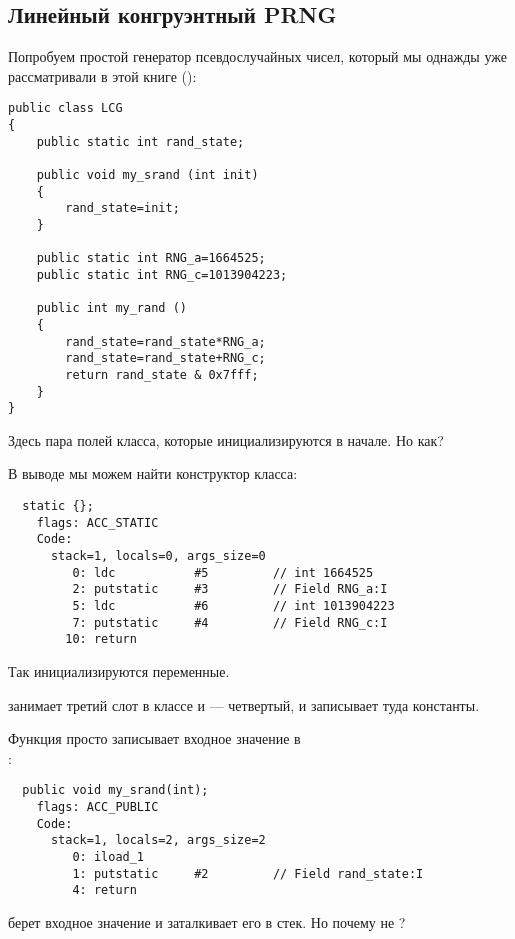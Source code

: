 \subsection{Линейный конгруэнтный \ac{PRNG}}


Попробуем простой генератор псевдослучайных чисел, 
который мы однажды уже рассматривали в этой книге ():

\begin{lstlisting}
public class LCG 
{
	public static int rand_state;

	public void my_srand (int init)
	{
		rand_state=init;
	}

	public static int RNG_a=1664525;
	public static int RNG_c=1013904223;

	public int my_rand ()
	{
		rand_state=rand_state*RNG_a;
		rand_state=rand_state+RNG_c;
		return rand_state & 0x7fff;
	}
}
\end{lstlisting}


Здесь пара полей класса, которые инициализируются в начале.
Но как?

В выводе  мы можем найти конструктор класса:

\begin{lstlisting}
  static {};
    flags: ACC_STATIC
    Code:
      stack=1, locals=0, args_size=0
         0: ldc           #5         // int 1664525
         2: putstatic     #3         // Field RNG_a:I
         5: ldc           #6         // int 1013904223
         7: putstatic     #4         // Field RNG_c:I
        10: return        
\end{lstlisting}


Так инициализируются переменные.

 занимает третий слот в классе и  --- четвертый, 
и  записывает туда константы.


Функция  просто записывает входное значение в \\ 
:

\begin{lstlisting}
  public void my_srand(int);
    flags: ACC_PUBLIC
    Code:
      stack=1, locals=2, args_size=2
         0: iload_1       
         1: putstatic     #2         // Field rand_state:I
         4: return        
\end{lstlisting}


 берет входное значение и заталкивает его в стек. Но почему не ?

